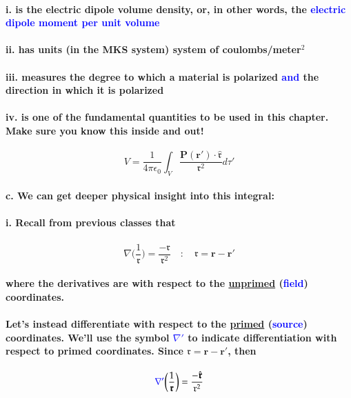 \documentclass{article}
\begin{document}
\paragraph{\indent i. is the electric dipole volume density, or, in other words, the \textcolor{blue}{electric dipole moment per unit volume}}
\paragraph{\indent ii. has units (in the MKS system) system of coulombs/meter$^2$}
\paragraph{\indent iii. measures the degree to which a material is polarized \textcolor{blue}{and} the direction in which it is polarized}
\paragraph{\indent iv. is one of the fundamental quantities to be used in this chapter. Make sure you know this inside and out!}
\begin{equation*}
    V=\frac{1}{4\pi\epsilon_0}\int_V  \frac{\boldsymbol{P}(\boldsymbol{r'})\cdot \hat{\boldsymbol{\mathfrak{r}}}}{\mathfrak{r}^2}d\tau'
\end{equation*}
\paragraph{\indent c. We can get deeper physical insight into this integral:}
\paragraph{\indent \indent i. Recall from previous classes that }
\begin{equation*}
    \nabla \bigg( \frac{1}{\mathfrak{r}}\bigg) =\frac{-\hat{\boldsymbol{\mathfrak{r}}}}{\mathfrak{r}^2}\quad :\quad \boldsymbol{\mathfrak{r}}=\boldsymbol{r-r'}
\end{equation*}
\paragraph{where the derivatives are with respect to the \underline{unprimed} (\textcolor{blue}{field}) coordinates.}
\paragraph{Let's instead differentiate with respect to the \underline{primed} (\textcolor{blue}{source}) coordinates. We'll use the symbol \textcolor{blue}{$\nabla'$} to indicate differentiation with respect to primed coordinates. Since $\boldsymbol{\mathfrak{r}}=\boldsymbol{r-r'}$, then }
\begin{equation*}
    \textcolor{blue}{\nabla'}\bigg(\frac{1}{\boldsymbol{\mathfrak{r}}}\bigg)=\frac{-\hat{\boldsymbol{\mathfrak{r}}}}{\mathfrak{r}^2}
\end{equation*}
\end{document}
